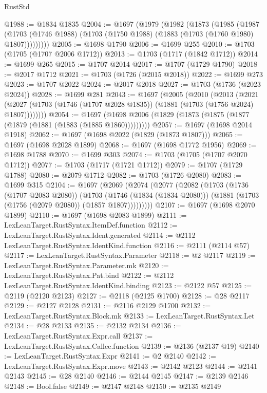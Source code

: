 \begin{lexlean}{RustStd}
\begin{coremodule}
@1988 := @1834 @1835
@2004 := @1697
    (@1979
      (@1982
        (@1873
          (@1985
            (@1987
              (@1703 (@1746 @1988) (@1703 (@1750 @1988) (@1883 (@1703 (@1760 @1980) @1807)))))))))
@2005 := @1698 @1790
@2006 := @1699 @255
@2010 := @1703 (@1705 (@1707 @2006 @1712))
@2013 := @1703 (@1717 (@1842 @1712))
@2014 := @1699 @265
@2015 := @1707 @2014
@2017 := @1707 (@1729 @1790)
@2018 := @2017 @1712
@2021 := @1703 (@1726 (@2015 @2018))
@2022 := @1699 @273
@2023 := @1707 @2022
@2024 := @2017 @2018
@2027 := @1703 (@1736 (@2023 @2024))
@2028 := @1699 @281
@2043 := @1697
    (@2005
      (@2010
        (@2013
          (@2021 (@2027 (@1703 (@1746 (@1707 @2028 @1835)) (@1881 (@1703 (@1756 @2024) @1807))))))))
@2054 := @1697 (@1698 @2006 (@1829 (@1873 (@1875 (@1877 (@1879 (@1881 (@1883 (@1885 @1860)))))))))
@2057 := @1697 (@1698 @2014 @1918)
@2062 := @1697 (@1698 @2022 (@1829 (@1873 @1807)))
@2065 := @1697 (@1698 @2028 @1899)
@2068 := @1697 (@1698 @1772 @1956)
@2069 := @1698 @1788
@2070 := @1699 @303
@2074 := @1703 (@1705 (@1707 @2070 @1712))
@2077 := @1703 (@1717 (@1721 @1712))
@2079 := @1707 (@1729 @1788)
@2080 := @2079 @1712
@2082 := @1703 (@1726 @2080)
@2083 := @1699 @315
@2104 := @1697
    (@2069
      (@2074
        (@2077
          (@2082
            (@1703
              (@1736 (@1707 @2083 @2080))
              (@1703
                (@1746 (@1834 (@1834 @2080)))
                (@1881 (@1703 (@1756 (@2079 @2080)) (@1857 @1807)))))))))
@2107 := @1697 (@1698 @2070 @1899)
@2110 := @1697 (@1698 @2083 @1899)
@2111 := LexLeanTarget.RustSyntax.ItemDef.function
@2112 := LexLeanTarget.RustSyntax.Ident.generated
@2114 := @2112 LexLeanTarget.RustSyntax.IdentKind.function
@2116 := @2111 (@2114 @57)
@2117 := LexLeanTarget.RustSyntax.Parameter
@2118 := @2 @2117
@2119 := LexLeanTarget.RustSyntax.Parameter.mk
@2120 := LexLeanTarget.RustSyntax.Pat.bind
@2122 := @2112 LexLeanTarget.RustSyntax.IdentKind.binding
@2123 := @2122 @57
@2125 := @2119 (@2120 @2123)
@2127 := @2118 (@2125 @1700)
@2128 := @28 @2117
@2129 := @2127 @2128
@2131 := @2116 @2129 @1700
@2132 := LexLeanTarget.RustSyntax.Block.mk
@2133 := LexLeanTarget.RustSyntax.Let
@2134 := @28 @2133
@2135 := @2132 @2134
@2136 := LexLeanTarget.RustSyntax.Expr.call
@2137 := LexLeanTarget.RustSyntax.Callee.function
@2139 := @2136 (@2137 @19)
@2140 := LexLeanTarget.RustSyntax.Expr
@2141 := @2 @2140
@2142 := LexLeanTarget.RustSyntax.Expr.move
@2143 := @2142 @2123
@2144 := @2141 @2143
@2145 := @28 @2140
@2146 := @2144 @2145
@2147 := @2139 @2146
@2148 := Bool.false
@2149 := @2147 @2148
@2150 := @2135 @2149

\end{coremodule}
\end{lexlean}
